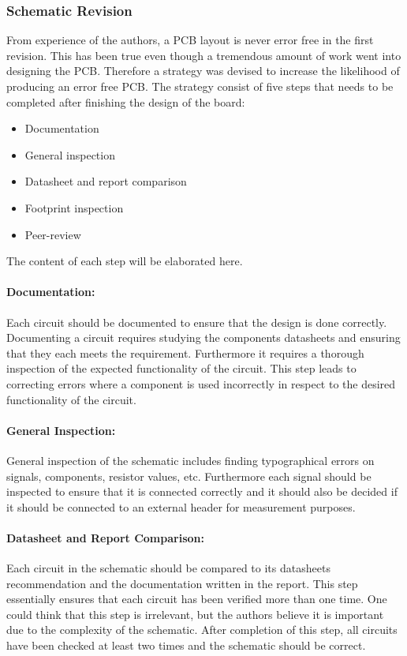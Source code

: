 \subsubsection{Schematic Revision} %
\label{ssub:schematic_revision}

From experience of the authors, a PCB layout is never error free in the first revision. 
This has been true even though a tremendous amount of work went into designing the PCB.
Therefore a strategy was devised to increase the likelihood of producing an error free PCB.
The strategy consist of five steps that needs to be completed after finishing the design of the board:

\begin{itemize}
	\item Documentation
	\item General inspection
	\item Datasheet and report comparison
	\item Footprint inspection 
	\item Peer-review
\end{itemize}

The content of each step will be elaborated here. 

\paragraph{Documentation:}
Each circuit should be documented to ensure that the design is done correctly.
Documenting a circuit requires studying the components datasheets and ensuring that they each meets the requirement.
Furthermore it requires a thorough inspection of the expected functionality of the circuit.
This step leads to correcting errors where a component is used incorrectly in respect to the desired functionality of the circuit.

\paragraph{General Inspection:}
General inspection of the schematic includes finding typographical errors on signals, components, resistor values, etc.
Furthermore each signal should be inspected to ensure that it is connected correctly and it should also be decided if it should be connected to an external header for measurement purposes.

\paragraph{Datasheet and Report Comparison:}
Each circuit in the schematic should be compared to its datasheets recommendation and the documentation written in the report. 
This step essentially ensures that each circuit has been verified more than one time. 
One could think that this step is irrelevant, but the authors believe it is important due to the complexity of the schematic.
After completion of this step, all circuits have been checked at least two times and the schematic should be correct. 

